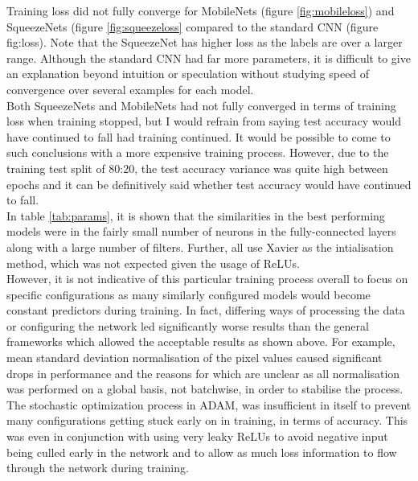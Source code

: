 \documentclass{article}
\begin{document}
Training loss did not fully converge for MobileNets (figure \ref{fig:mobileloss}) and SqueezeNets (figure \ref{fig:squeezeloss} compared to the standard CNN (figure fig:loss). Note that the SqueezeNet has higher loss as the labels are over a larger range. Although the standard CNN had far more parameters, it is difficult to give an explanation beyond intuition or speculation without studying speed of convergence over several examples for each model. \\

Both SqueezeNets and MobileNets had not fully converged in terms of training loss when training stopped, but I would refrain from saying test accuracy would have continued to fall had training continued. It would be possible to come to such conclusions with a more expensive training process. However, due to the training test split of 80:20, the test accuracy variance was quite high between epochs and it can be definitively said whether test accuracy would have continued to fall.\\

In table \ref{tab:params}, it is shown that the similarities in the best performing models were in the fairly small number of neurons in the fully-connected layers along with a large number of filters. Further, all use Xavier as the intialisation method, which was not expected given the usage of ReLUs.\\

However, it is not indicative of this particular training process overall to focus on specific configurations as many similarly configured models would become constant predictors during training. In fact, differing ways of processing the data or configuring the network led significantly worse results than the general frameworks which allowed the acceptable results as shown above. For example, mean standard deviation normalisation of the pixel values caused significant drops in performance and the reasons for which are unclear as all normalisation was performed on a global basis, not batchwise, in order to stabilise the process. \\

The stochastic optimization process in ADAM, was insufficient in itself to prevent many configurations getting stuck early on in training, in terms of accuracy. This was even in conjunction with using very leaky ReLUs to avoid negative input being culled early in the network and to allow as much loss information to flow through the network during training.\\
\end{document}
